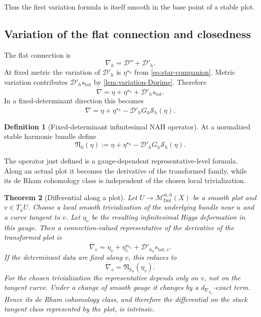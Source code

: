 \documentclass[11pt,reqno]{amsart}
\newtheorem{theorem}{Theorem}[section]
\theoremstyle{definition}
\newtheorem{definition}[theorem]{Definition}
\theoremstyle{remark}
\newcommand{\cD}{\mathcal D}
\newcommand{\cS}{\mathcal S}
\newcommand{\Dol}{\mathrm{Dol}}
\newcommand{\st}{\mathrm{st}}
\newcommand{\MdiffDol}{\mathscr M_{\Dol}}
\begin{document}
Thus the first variation formula is itself smooth in the base point of a stable plot.

\subsection{Variation of the flat connection and closedness}

The flat connection is
\[
  \nabla_h=\cD''+\cD'_h.
\]
At fixed metric the variation of $\cD'_h$ is $\eta^{\star_h}$ from \eqref{eq:star-companion}.  Metric variation contributes $\cD'_h s_{\mathrm{tot}}$ by \cref{lem:variation-Dprime}.  Therefore
\begin{equation}\label{eq:flat-variation}
  \dot\nabla
  =\eta+\eta^{\star_h}+\cD'_h s_{\mathrm{tot}}.
\end{equation}
In a fixed-determinant direction this becomes
\begin{equation}\label{eq:dNAH-explicit}
  \dot\nabla
  =\eta+\eta^{\star_h}
  -\cD'_hG_h\cS_h(\eta).
\end{equation}

\begin{definition}[Fixed-determinant infinitesimal NAH operator]\label{def:inf-NAH}
At a normalized stable harmonic bundle define
\begin{equation}\label{eq:inf-NAH-operator}
  \mathfrak N_h(\eta)
  :=\eta+\eta^{\star_h}
  -\cD'_hG_h\cS_h(\eta).
\end{equation}
\end{definition}

The operator just defined is a gauge-dependent representative-level formula.  Along an actual plot it becomes the derivative of the transformed family, while its de Rham cohomology class is independent of the chosen local trivialization.

\begin{theorem}[Differential along a plot]\label{thm:differential-plot}
Let $U\to\MdiffDol^{\st,0}(X)$ be a smooth plot and $v\in T_uU$.  Choose a local smooth trivialization of the underlying bundle near $u$ and a curve tangent to $v$.  Let $\eta_v$ be the resulting infinitesimal Higgs deformation in this gauge.  Then a connection-valued representative of the derivative of the transformed plot is
\begin{equation}\label{eq:differential-plot-formula}
  \dot\nabla_v
  =\eta_v+\eta_v^{\star_{h_u}}
   +\cD'_{h_u}s_{\mathrm{tot},v}.
\end{equation}
If the determinant data are fixed along $v$, this reduces to
\[
  \dot\nabla_v=\mathfrak N_{h_u}(\eta_v).
\]
For the chosen trivialization the representative depends only on $v$, not on the tangent curve.  Under a change of smooth gauge it changes by a $d_{\nabla_{h_u}}$-exact term.  Hence its de Rham cohomology class, and therefore the differential on the stack tangent class represented by the plot, is intrinsic.
\end{theorem}
\end{document}

